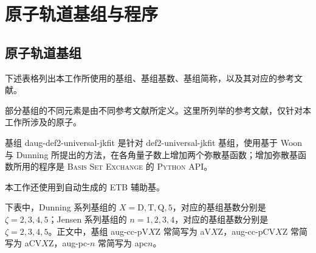 
\chapter{原子轨道基组与程序}
\label{sec.app.basis}

\section{原子轨道基组}
\label{sec.A.basis-set}

下述表格列出本工作所使用的基组、基组基数、基组简称，以及其对应的参考文献。

部分基组的不同元素是由不同参考文献所定义。这里所列举的参考文献，仅针对本工作所涉及的原子。

基组 daug-def2-universal-jkfit 是针对 def2-universal-jkfit 基组，使用基于 Woon 与 Dunning 所提出的方法\cite{Woon-Dunning.JCP.1994}，在各角量子数上增加两个弥散基函数；增加弥散基函数所用的程序是 \textsc{Basis Set Exchange} 的 \textsc{Python} API。

本工作还使用到自动生成的 ETB 辅助基\cite{Stoychev-Neese.JCTC.2017}。

下表中，Dunning 系列基组的 $X = \mathrm{D, T, Q, 5}$，对应的基组基数分别是 $\zeta = 2, 3, 4, 5$；Jensen 系列基组的 $n = 1, 2, 3, 4$，对应的基组基数分别是 $\zeta = 2, 3, 4, 5$。正文中，基组 aug-cc-pV$X$Z 常简写为 aV$X$Z，aug-cc-pCV$X$Z 常简写为 aCV$X$Z，aug-pc-$n$ 常简写为 apc$n$。

\begingroup
\setlength{\LTleft}{-20cm plus -1fill}
\setlength{\LTright}{\LTleft}

